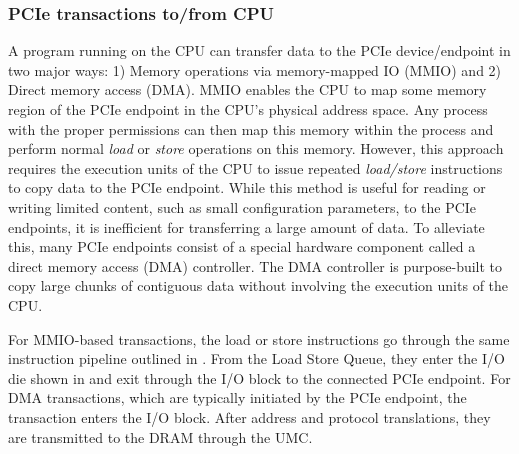 \subsubsection{PCIe transactions to/from CPU}
\label{subsubsec:interconnect-sc-background-cpu-arch-pcie-transactions}

A program running on the CPU can transfer data to the PCIe device/endpoint in two major ways: 1) Memory operations via memory-mapped IO (MMIO) and 2) Direct memory access (DMA).
MMIO enables the CPU to map some memory region of the PCIe endpoint in the CPU's physical address space.
Any process with the proper permissions can then map this memory within the process and perform normal \textit{load} or \textit{store} operations on this memory.
However, this approach requires the execution units of the CPU to issue repeated \textit{load/store} instructions to copy data to the PCIe endpoint.
While this method is useful for reading or writing limited content, such as small configuration parameters, to the PCIe endpoints, it is inefficient for transferring a large amount of data.
To alleviate this, many PCIe endpoints consist of a special hardware component called a direct memory access (DMA) controller.
The DMA controller is purpose-built to copy large chunks of contiguous data without involving the execution units of the CPU.

For MMIO-based transactions, the load or store instructions go through the same instruction pipeline outlined in . 
From the Load Store Queue, they enter the I/O die shown in  and exit through the I/O block to the connected PCIe endpoint.
For DMA transactions, which are typically initiated by the PCIe endpoint, the transaction enters the I/O block. 
After address and protocol translations, they are transmitted to the DRAM through the UMC.